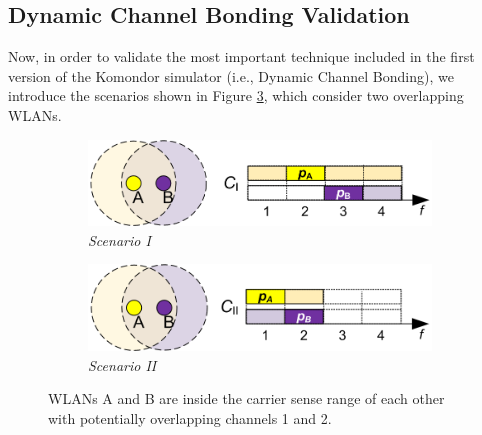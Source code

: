 \documentclass[a4paper]{article}
\begin{document}
	\subsection{Dynamic Channel Bonding Validation}
	\label{section:validations_channel_bonding}
	Now, in order to validate the most important technique included in the first version of the Komondor simulator (i.e., Dynamic Channel Bonding), we introduce the scenarios shown in Figure \ref{fig:cb_scenarios}, which consider two overlapping WLANs.
	\begin{figure}[h!]
		\centering
		\begin{subfigure}[b]{0.475\textwidth}
			\includegraphics[width=1\textwidth]{images/scenario_I.png}
			\caption{\textit{Scenario I}}
			\label{fig:scenario_I}
		\end{subfigure}
		\begin{subfigure}[b]{0.475\textwidth}
			\includegraphics[width=1\textwidth]{images/scenario_II.png}
			\caption{\textit{Scenario II}}
			\label{fig:scenario_II}
		\end{subfigure}
		\caption{WLANs A and B are inside the carrier sense range of each other with potentially overlapping channels 1 and 2.}
		\label{fig:cb_scenarios}
	\end{figure}
	
\end{document}
